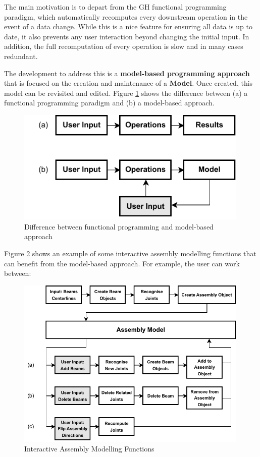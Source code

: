 The main motivation is to depart from the GH functional programming paradigm, which automatically recomputes every downstream operation in the event of a data change. While this is a nice feature for ensuring all data is up to date, it also prevents any user interaction beyond changing the initial input. In addition, the full recomputation of every operation is slow and in many cases redundant.

The development to address this is a \textbf{model-based programming approach} that is focused on the creation and maintenance of a \textbf{Model}. Once created, this model can be revisited and edited. Figure \ref{fig:functional-programming-approach} shows the difference between (a) a functional programming paradigm and (b) a model-based approach.

\begin{figure}[!h]
    \centering
    \includegraphics[width=0.99\textwidth]{images/6a/interactive_1.pdf}
    \caption{Difference between functional programming and model-based approach}
    \label{fig:functional-programming-approach}
\end{figure}


Figure \ref{fig:interactive-assembly-modelling-functions} shows an example of some interactive assembly modelling functions that can benefit from the model-based approach. For example, the user can work between:

\begin{figure}[!h]
    \centering
    \includegraphics[width=0.99\textwidth]{images/6a/interactive_2.pdf}
    \caption{Interactive Assembly Modelling Functions}
    \label{fig:interactive-assembly-modelling-functions}
\end{figure}


